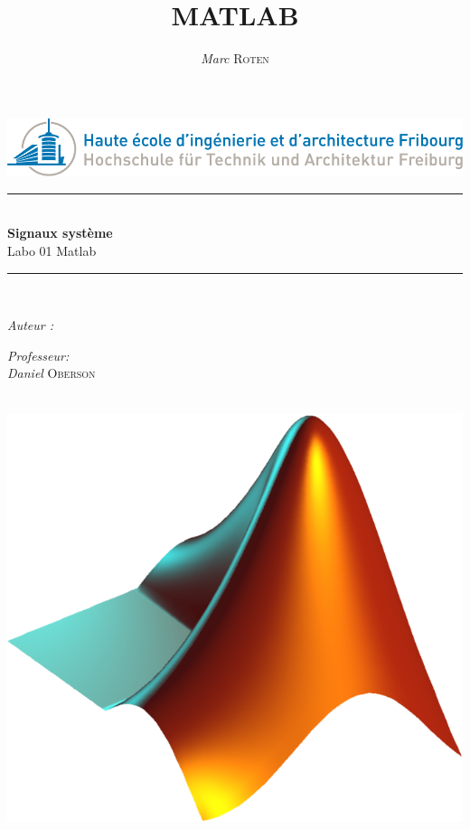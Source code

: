 

\title{MATLAB  } 
\author{\textsl{Marc} \textsc{Roten}}
\date{}


    \begin{titlepage}
        \begin{center}
            \includegraphics[scale=.4]{Img/heia-fr-logo.png}\\[1.3cm]
            
            \rule{\linewidth}{0.3mm} \\[0.3cm]
            {\huge \bfseries Signaux système\\[0.5cm]} 
            {\Large  Labo 01 Matlab }
            \rule{\linewidth}{0.3mm} \\[0.8cm]
            \noindent
            \begin{minipage}[t]{0.4\textwidth}
                \begin{flushleft} \large
                    \emph{Auteur :}\\
                    \theauthor
                \end{flushleft}
            \end{minipage}
            \begin{minipage}[t]{0.4\textwidth} 
                \begin{flushright} \large
                    \emph{Professeur:}\\
                    \textsl{Daniel} \textsc{ Oberson}\\ 
                \end{flushright} 
                \vfill
            \end{minipage}\\[1.3cm]
            \includegraphics[scale=0.5]{Img/title.jpg}\\[1.5cm]

\end{center}
\end{titlepage}
